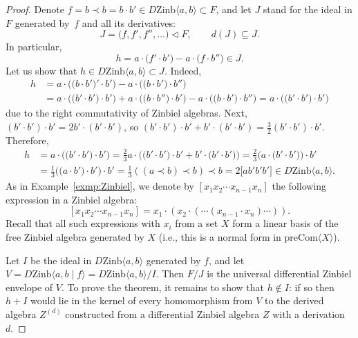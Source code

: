 \documentclass[pdftex]{sigma}
\numberwithin{equation}{section}
\def\Com{\mathrm{Com}}
\def\Zinb{\mathrm{Zinb}}
\def\pre{\mathrm{pre}}
\begin{document}
\begin{proof}
Denote $f=b\prec b=b\cdot b' \in D\Zinb \langle a,b\rangle \subset F$, and let $J$ stand for the ideal in $F$ generated by~$f$ and all its derivatives:
\[
J = \bigl(f,f',f'', \dots \bigr) \triangleleft F,\qquad d(J)\subseteq J.
\]
In particular,
\[
h = a\cdot \bigl(f'\cdot b'\bigr)-a\cdot \bigl(f\cdot b''\bigr) \in J.
\]
Let us show that $h\in D\Zinb \langle a,b\rangle \subset J$.
Indeed,
\begin{align*}
h &= a\cdot \bigl(\bigl(b\cdot b'\bigr)'\cdot b'\bigr)-a\cdot \bigl(\bigl(b\cdot b'\bigr)\cdot b''\bigr) \\
 &= a\cdot \bigl(\bigl(b'\cdot b'\bigr)\cdot b'\bigr) + a\cdot \bigl(\bigl(b\cdot b''\bigr)\cdot b'\bigr)-a\cdot \bigl(\bigl(b\cdot b'\bigr)\cdot b''\bigr)
 = a\cdot \bigl(\bigl(b'\cdot b'\bigr)\cdot b'\bigr)
\end{align*}
due to the right commutativity of Zinbiel algebras.
Next,
$(b'\cdot b')\cdot b' = 2b'\cdot (b'\cdot b')$,
so
$(b'\cdot b')\cdot b'+b'\cdot (b'\cdot b')
= \frac{3}{2} (b'\cdot b')\cdot b'$.
Therefore,
\begin{align*}
h &= a\cdot \bigl(\bigl(b'\cdot b'\bigr)\cdot b'\bigr)
= \frac{2}{3} a\cdot \bigl(\bigl(b'\cdot b'\bigr)\cdot b' + b'\cdot \bigl(b'\cdot b'\bigr)\bigr)
 = \frac{2}{3} \bigl(a\cdot \bigl(b'\cdot b'\bigr)\bigr)\cdot b'
 \\
 &= \frac{1}{3} \bigl(\bigl(a\cdot b'\bigr)\cdot b'\bigr)\cdot b'= \frac{1}{3} ((a\prec b)\prec b)\prec b = 2\bigl[ab'b'b'\bigr]
 \in D\Zinb \langle a,b\rangle .
\end{align*}
As in Example~\ref{exmp:Zinbiel}, we denote by
$[x_1x_2\cdots x_{n-1}x_n]$ the following expression
in a Zinbiel algebra:
\[
[x_1x_2\cdots x_{n-1}x_n]
= x_1\cdot (x_2\cdot (\cdots (x_{n-1}\cdot x_n)\cdots )).
\]
Recall \cite{Loday} that all such expressions with $x_i$
from a set $X$ form a linear basis of the free Zinbiel algebra
generated by $X$ (i.e., this is a normal form in $\pre\Com\langle X\rangle $).

Let $I$ be the ideal in $D\Zinb \langle a,b\rangle $
generated by $f$, and let $V = D\Zinb \langle a,b\mid f\rangle
=D\Zinb \langle a,b\rangle/I $.
Then
$F/J$ is the universal differential Zinbiel envelope
of $V$. To prove the theorem, it remains to show that $h\notin I$:
if so then $h+I$
would lie in the kernel of every homomorphism
from $V$ to the derived algebra $Z^{(d)}$
constructed
from a differential Zinbiel algebra $Z$ with a derivation~$d$.


\end{proof}
\end{document}
